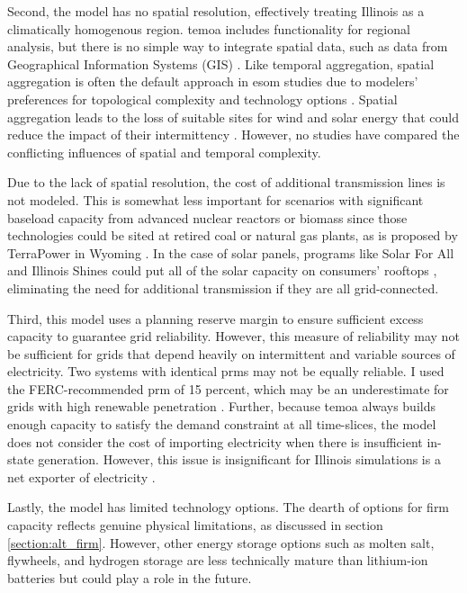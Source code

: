 Second, the model has no spatial resolution, effectively treating Illinois as a
climatically homogenous region. \gls{temoa} includes functionality for regional
analysis, but there is no simple way to integrate spatial data, such
as data from Geographical Information Systems (GIS) \cite{martinez-gordon_review_2021}.
Like temporal aggregation, spatial aggregation is often the default approach in
\gls{esom} studies due to modelers' preferences for topological complexity and
technology options \cite{martinez-gordon_review_2021,poncelet_impact_2016}. Spatial
aggregation leads to the loss of suitable sites for wind and solar energy that could
reduce the impact of their intermittency \cite{fleischer_minimising_2020}. However,
no studies have compared the conflicting influences of spatial and temporal complexity.

Due to the lack of spatial resolution, the cost of additional transmission lines
is not modeled. This is somewhat less important for scenarios with significant
baseload capacity from advanced nuclear reactors or biomass since those technologies
could be sited at retired coal or natural gas plants, as is proposed by TerraPower
in Wyoming \cite{associated_press_bill_2021}. In the case of solar panels, programs
like Solar For All and Illinois Shines \cite{chicago_illinois_nodate, noauthor_illinois_nodate}
could put all of the solar capacity on consumers' rooftops \cite{lopez_us_2012},
eliminating the need for additional transmission if they are all grid-connected.

Third, this model uses a planning reserve margin to ensure sufficient
excess capacity to guarantee grid reliability. However, this measure of reliability
may not be sufficient for grids that depend heavily on intermittent and variable
sources of electricity. Two systems with identical \glspl{prm} may not be equally
reliable. I used the FERC-recommended \gls{prm} of 15 percent, which may be
an underestimate for grids with high renewable penetration \cite{milligan_methods_2011}.
Further, because \gls{temoa} always builds enough capacity to satisfy the demand
constraint at all time-slices, the model does not consider the cost of
importing electricity when there is insufficient in-state generation. However,
this issue is insignificant for Illinois simulations is a net exporter of electricity
\cite{energy_information_administration_eia_nodate}.

Lastly, the model has limited technology options. The dearth of options for
firm capacity reflects genuine physical limitations, as discussed in section
\ref{section:alt_firm}. However, other energy storage options such as
molten salt, flywheels, and hydrogen storage are less technically mature
than lithium-ion batteries but could play a role in the future.
